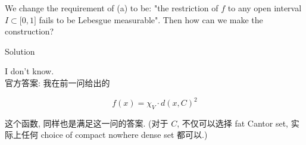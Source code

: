 We change the requirement of (a) to be: "the restriction of \(f\) to any open interval \(I \subset \lbrack 0,1\rbrack\) fails to be Lebesgue measurable". Then how can we make the construction?

\begin{qlsolution}{Solution}

I don't know.\\
官方答案: 我在前一问给出的

\[f(x) = \chi_{V} \cdot d(x,C)^{2}\]

这个函数, 同样也是满足这一问的答案. (对于 \(C\), 不仅可以选择 fat Cantor set, 实际上任何 choice of compact nowhere dense set 都可以.)

\end{qlsolution}
